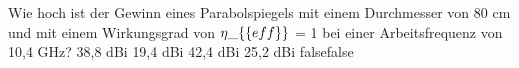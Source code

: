     {Wie hoch ist der Gewinn eines Parabolspiegels mit einem Durchmesser von 80 cm und mit einem Wirkungsgrad von $\eta\_\{\textrm\{eff\}\}$ = 1 bei einer Arbeitsfrequenz von 10,4 GHz?}
    {38,8 dBi}
    {19,4 dBi}
    {42,4 dBi}
    {25,2 dBi}
    {false}{false}